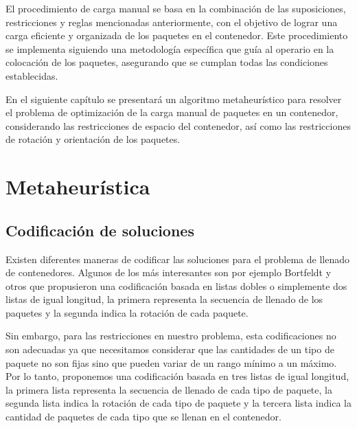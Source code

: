 \documentclass[openany]{article}
\begin{document}
El procedimiento de carga manual se basa en la combinación de las suposiciones, restricciones y reglas mencionadas anteriormente, con el objetivo de lograr una carga eficiente y organizada de los paquetes en el contenedor. Este procedimiento se implementa siguiendo una metodología específica que guía al operario en la colocación de los paquetes, asegurando que se cumplan todas las condiciones establecidas.

En el siguiente capítulo se presentará un algoritmo metaheurístico para resolver el problema de optimización de la carga manual de paquetes en un contenedor, considerando las restricciones de espacio del contenedor, así como las restricciones de rotación y orientación de los paquetes.








\newpage








\section{Metaheurística}

\subsection{Codificación de soluciones}
\label{sec:codificacion}

Existen diferentes maneras de codificar las soluciones para el problema de llenado de contenedores. Algunos de los más interesantes son por ejemplo Bortfeldt y otros \cite{GEHRING1997401} que propusieron una codificación basada en listas dobles o simplemente dos listas de igual longitud, la primera representa la secuencia de llenado de los paquetes y la segunda indica la rotación de cada paquete.

Sin embargo, para las restricciones en nuestro problema, esta codificaciones no son adecuadas ya que necesitamos considerar que las cantidades de un tipo de paquete no son fijas sino que pueden variar de un rango mínimo a un máximo. Por lo tanto, proponemos una codificación basada en tres listas de igual longitud, la primera lista representa la secuencia de llenado de cada tipo de paquete, la segunda lista indica la rotación de cada tipo de paquete y la tercera lista indica la cantidad de paquetes de cada tipo que se llenan en el contenedor.
\end{document}
